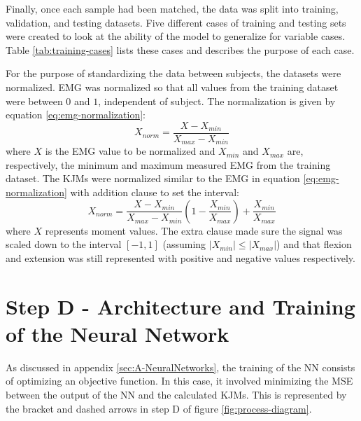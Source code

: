 \documentclass[../main.tex]{subfiles}
\begin{document}
Finally, once each sample had been matched, the data was split into training, validation, and testing datasets.
Five different cases of training and testing sets were created to look at the ability of the model to generalize for variable cases.
Table \ref{tab:training-cases} lists these cases and describes the purpose of each case.


For the purpose of standardizing the data between subjects, the datasets were normalized.
\ac{EMG} was normalized so that all values from the training dataset were between $0$ and $1$, independent of subject.
The normalization is given by equation \ref{eq:emg-normalization}:
\begin{equation}
\label{eq:emg-normalization}
    X_{norm} = \frac{X - X_{min}}{X_{max} - X_{min}}
\end{equation}
where $X$ is the \ac{EMG} value to be normalized and $X_{min}$ and $X_{max}$ are, respectively, the minimum and maximum measured \ac{EMG} from the training dataset. 
The \acp{KJM} were normalized similar to the \ac{EMG} in equation \ref{eq:emg-normalization} with addition clause to set the interval:
\begin{equation}
\label{eq:moment-normalization}
    X_{norm} = \frac{X - X_{min}}{X_{max} - X_{min}}\left(1 - \frac{X_{min}}{X_{max}}\right) + \frac{X_{min}}{X_{max}}
\end{equation}
where $X$ represents moment values. 
The extra clause made sure the signal was scaled down to the interval $[-1,1]$ (assuming $\left|X_{min}\right| \leq \left|X_{max}\right|$) and that flexion and extension was still represented with positive and negative values respectively.

\section{Step D - Architecture and Training of the Neural Network}
As discussed in appendix \ref{sec:A-NeuralNetworks}, the training of the \ac{NN} consists of optimizing an objective function.
In this case, it involved minimizing the \ac{MSE} between the output of the \ac{NN} and the calculated \acp{KJM}.
This is represented by the bracket and dashed arrows in step D of figure \ref{fig:process-diagram}.
\end{document}
